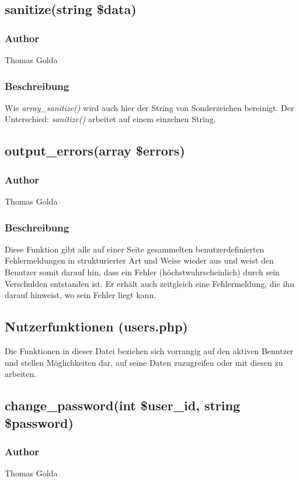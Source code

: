 \documentclass[fontsize = 12pt, paper = a4]{scrreprt}
\begin{document}
\subsection*{sanitize(string \$data)}
\subsubsection*{Author}
Thomas Golda
\subsubsection*{Beschreibung}
Wie \textit{array\_sanitize()} wird auch hier der String von Sonderzeichen bereinigt. Der Unterschied: \textit{sanitize()} arbeitet auf einem einzelnen 
String.


\subsection*{output\_errors(array \$errors)}
\subsubsection*{Author}
Thomas Golda
\subsubsection*{Beschreibung}
Diese Funktion gibt alle auf einer Seite gesammelten benutzerdefinierten Fehlermeldungen in strukturierter Art und Weise wieder aus und weist den Benutzer somit darauf hin, dass ein Fehler (höchstwahrscheinlich) durch sein Verschulden entstanden ist. Er erhält auch zeitgleich eine Fehlermeldung, die ihn darauf hinweist, wo sein Fehler liegt kann.

\newpage


\subsection{Nutzerfunktionen (users.php)}
Die Funktionen in dieser Datei beziehen sich vorrangig auf den aktiven Benutzer und stellen Möglichkeiten dar, auf seine Daten zuzugreifen oder mit diesen zu arbeiten.
\subsection*{change\_password(int \$user\_id, string \$password)}
\subsubsection*{Author}
Thomas Golda
\end{document}
